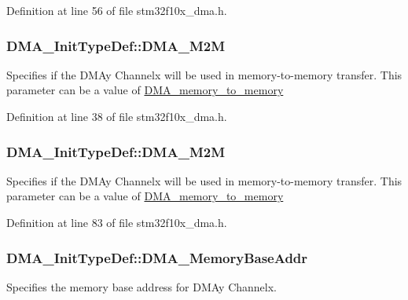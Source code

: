 Definition at line 56 of file stm32f10x\+\_\+dma.\+h.

\subsubsection[{\texorpdfstring{D\+M\+A\+\_\+\+M2M}{DMA_M2M}}]{ D\+M\+A\+\_\+\+Init\+Type\+Def\+::\+D\+M\+A\+\_\+\+M2M}\hypertarget{struct_d_m_a___init_type_def_ae206a1c2552ed78d856fc790e9a955f4}{}\label{struct_d_m_a___init_type_def_ae206a1c2552ed78d856fc790e9a955f4}
Specifies if the D\+M\+Ay Channelx will be used in memory-\/to-\/memory transfer. This parameter can be a value of \hyperlink{group___d_m_a__memory__to__memory}{D\+M\+A\+\_\+memory\+\_\+to\+\_\+memory} 

Definition at line 38 of file stm32f10x\+\_\+dma.\+h.

\subsubsection[{\texorpdfstring{D\+M\+A\+\_\+\+M2M}{DMA_M2M}}]{ D\+M\+A\+\_\+\+Init\+Type\+Def\+::\+D\+M\+A\+\_\+\+M2M}\hypertarget{struct_d_m_a___init_type_def_a57944cc447e6fcde4e9aa6229d3b4c5d}{}\label{struct_d_m_a___init_type_def_a57944cc447e6fcde4e9aa6229d3b4c5d}
Specifies if the D\+M\+Ay Channelx will be used in memory-\/to-\/memory transfer. This parameter can be a value of \hyperlink{group___d_m_a__memory__to__memory}{D\+M\+A\+\_\+memory\+\_\+to\+\_\+memory} 

Definition at line 83 of file stm32f10x\+\_\+dma.\+h.

\subsubsection[{\texorpdfstring{D\+M\+A\+\_\+\+Memory\+Base\+Addr}{DMA_MemoryBaseAddr}}]{ D\+M\+A\+\_\+\+Init\+Type\+Def\+::\+D\+M\+A\+\_\+\+Memory\+Base\+Addr}\hypertarget{struct_d_m_a___init_type_def_a5e260bb85f55c8a4c9d06302ce9ccc4c}{}\label{struct_d_m_a___init_type_def_a5e260bb85f55c8a4c9d06302ce9ccc4c}
Specifies the memory base address for D\+M\+Ay Channelx. 

